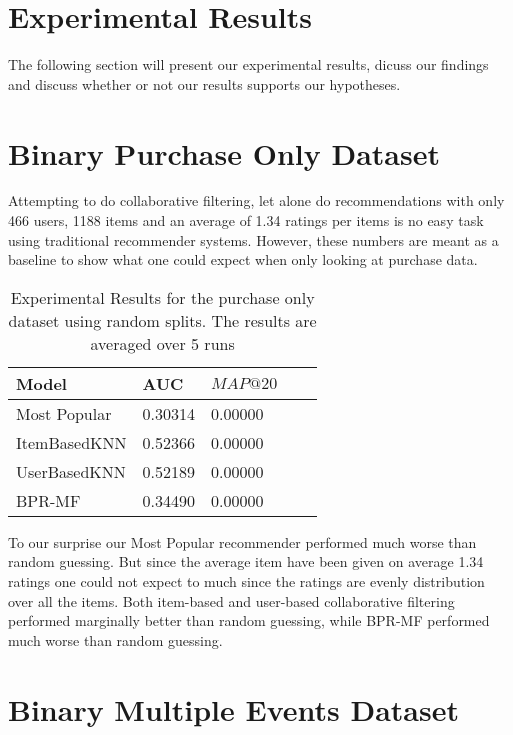 
\section{Experimental Results}

The following section will present our experimental results, dicuss our findings and
discuss whether or not our results supports our hypotheses.

\section{Binary Purchase Only Dataset}

Attempting to do collaborative filtering, let alone do recommendations with only 466 users, 1188 items and
an average of 1.34 ratings per items is no easy task using traditional recommender systems. However, these numbers
are meant as a baseline to show what one could expect when only looking at purchase data.

\begin{table}[H]
    \centering
    \begin{tabular}{*{5}l}
    \toprule
    Model 			&	AUC			&	$MAP@20$ \\ \midrule
    Most Popular	&	0.30314		&	0.00000	\\
    ItemBasedKNN	&	0.52366		&	0.00000	\\
    UserBasedKNN	&	0.52189		&	0.00000	\\
    BPR-MF			&	0.34490		&	0.00000	\\
    \bottomrule
    \end{tabular}
\caption[Experimental Results - Purchase Only Dataset]{Experimental Results for the purchase only dataset using random splits. The results are averaged over 5 runs}
\end{table}

To our surprise our Most Popular recommender performed much worse than random guessing. But since the average item
have been given on average 1.34 ratings one could not expect to much since the ratings are evenly distribution over
all the items. Both item-based and user-based collaborative filtering performed marginally better than random guessing,
while BPR-MF performed much worse than random guessing.

\section{Binary Multiple Events Dataset}

